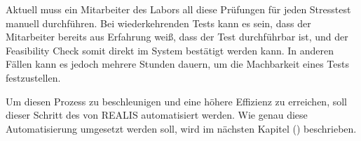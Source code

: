 Aktuell muss ein Mitarbeiter des Labors all diese Prüfungen für jeden Stresstest manuell durchführen. Bei wiederkehrenden Tests kann es sein, dass der Mitarbeiter bereits aus Erfahrung weiß, dass der Test durchführbar ist, und der Feasibility Check somit direkt im System bestätigt werden kann. In anderen Fällen kann es jedoch mehrere Stunden dauern, um die Machbarkeit eines Tests festzustellen.

Um diesen Prozess zu beschleunigen und eine höhere Effizienz zu erreichen, soll dieser Schritt des  von \gls{REALIS} automatisiert werden. Wie genau diese Automatisierung umgesetzt werden soll, wird im nächsten Kapitel () beschrieben.
